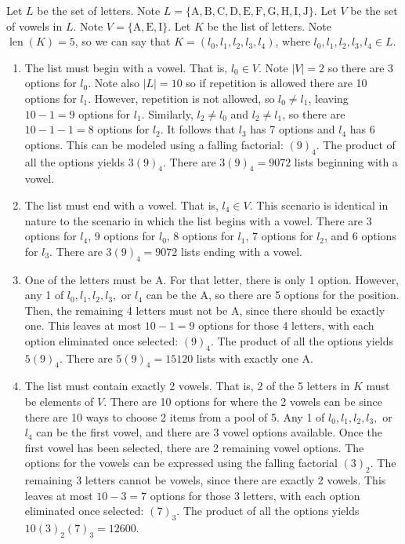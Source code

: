 \documentclass{article}
\theoremstyle{definition}
\DeclareMathOperator{\len}{len}
\begin{document}
\begin{solution}
Let $L$ be the set of letters. Note $L=\{\mathrm{A},\mathrm{B},\mathrm{C},\mathrm{D},\mathrm{E},\mathrm{F},\mathrm{G},\mathrm{H},\mathrm{I},\mathrm{J}\}$. Let $V$ be the set of vowels in $L$. Note $V=\{\mathrm{A},\mathrm{E},\mathrm{I}\}$. Let $K$ be the list of letters. Note $\len(K)=5$, so we can say that $K=(l_0,l_1,l_2,l_3,l_4)$, where $l_0,l_1,l_2,l_3,l_4\in L$. 
\begin{enumerate}
\item The list must begin with a vowel. That is, $l_0\in V$. Note $|V|=2$ so there are 3 options for $l_0$. Note also $|L|=10$ so if repetition is allowed there are 10 options for $l_1$. However, repetition is not allowed, so $l_0\neq l_1$, leaving $10-1=9$ options for $l_1$. Similarly, $l_2\neq l_0$ and $l_2\neq l_1$, so there are $10-1-1=8$ options for $l_2$. It follows that $l_3$ has 7 options and $l_4$ has 6 options. This can be modeled using a falling factorial: $(9)_4$. The product of all the options yields $3(9)_4$. There are $3(9)_4=9072$ lists beginning with a vowel.
\item The list must end with a vowel. That is, $l_4\in V$. This scenario is identical in nature to the scenario in which the list begins with a vowel. There are 3 options for $l_4$, 9 options for $l_0$, 8 options for $l_1$, 7 options for $l_2$, and 6 options for $l_3$. There are $3(9)_4=9072$ lists ending with a vowel.
\item One of the letters must be A. For that letter, there is only 1 option. However, any 1 of $l_0,l_1,l_2,l_3,$ or $l_4$ can be the A, so there are 5 options for the position. Then, the remaining 4 letters must not be A, since there should be exactly one. This leaves at most $10-1=9$ options for those 4 letters, with each option eliminated once selected: $(9)_4$. The product of all the options yields $5(9)_4$. There are $5(9)_4=15120$ lists with exactly one A.
\item The list must contain exactly 2 vowels. That is, 2 of the 5 letters in $K$ must be elements of $V$. There are 10 options for where the 2 vowels can be since there are 10 ways to choose 2 items from a pool of 5. Any 1 of $l_0,l_1,l_2,l_3,$ or $l_4$ can be the first vowel, and there are 3 vowel options available. Once the first vowel has been selected, there are 2 remaining vowel options. The options for the vowels can be expressed using the falling factorial $(3)_2$. The remaining 3 letters cannot be vowels, since there are exactly 2 vowels. This leaves at most $10-3=7$ options for those 3 letters, with each option eliminated once selected: $(7)_3$. The product of all the options yields $10(3)_2(7)_3=12600$.
\end{enumerate}
\end{solution}
\end{document}
